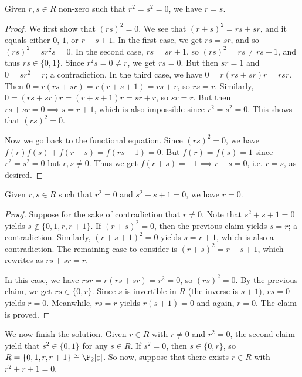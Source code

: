 \begin{claim}
Given $r, s \in R$ non-zero such that $r^2 = s^2 = 0$, we have $r = s$.
\end{claim}
\begin{proof}
We first show that $(rs)^2 = 0$.
We see that $(r + s)^2 = rs + sr$, and it equals either $0$, $1$, or $r + s + 1$.
In the first case, we get $rs = sr$, and so $(rs)^2 = sr^2 s = 0$.
In the second case, $rs = sr + 1$, so $(rs)^2 = rs \neq rs + 1$, and thus $rs \in \{0, 1\}$.
Since $r^2 s = 0 \neq r$, we get $rs = 0$.
But then $sr = 1$ and $0 = sr^2 = r$; a contradiction.
In the third case, we have $0 = r(rs + sr)r = rsr$.
Then $0 = r(rs + sr) = r(r + s + 1) = rs + r$, so $rs = r$.
Similarly, $0 = (rs + sr)r = (r + s + 1)r = sr + r$, so $sr = r$.
But then $rs + sr = 0 \implies s = r + 1$, which is also impossible since $r^2 = s^2 = 0$.
This shows that $(rs)^2 = 0$.

Now we go back to the functional equation.
Since $(rs)^2 = 0$, we have $f(r) f(s) + f(r + s) = f(rs + 1) = 0$.
But $f(r) = f(s) = 1$ since $r^2 = s^2 = 0$ but $r, s \neq 0$.
Thus we get $f(r + s) = -1 \implies r + s = 0$, i.e. $r = s$, as desired.
\end{proof}

\begin{claim}
Given $r, s \in R$ such that $r^2 = 0$ and $s^2 + s + 1 = 0$, we have $r = 0$.
\end{claim}
\begin{proof}
Suppose for the sake of contradiction that $r \neq 0$.
Note that $s^2 + s + 1 = 0$ yields $s \notin \{0, 1, r, r + 1\}$.
If $(r + s)^2 = 0$, then the previous claim yields $s = r$; a contradiction.
Similarly, $(r + s + 1)^2 = 0$ yields $s = r + 1$, which is also a contradiction.
The remaining case to consider is $(r + s)^2 = r + s + 1$, which rewrites as $rs + sr = r$.

In this case, we have $rsr = r(rs + sr) = r^2 = 0$, so $(rs)^2 = 0$.
By the previous claim, we get $rs \in \{0, r\}$.
Since $s$ is invertible in $R$ (the inverse is $s + 1$), $rs = 0$ yields $r = 0$.
Meanwhile, $rs = r$ yields $r(s + 1) = 0$ and again, $r = 0$.
The claim is proved.
\end{proof}

We now finish the solution.
Given $r \in R$ with $r \neq 0$ and $r^2 = 0$, the second claim yield that $s^2 \in \{0, 1\}$ for any $s \in R$.
If $s^2 = 0$, then $s \in \{0, r\}$, so $R = \{0, 1, r, r + 1\} \cong \F_2[\varepsilon]$.
So now, suppose that there exists $r \in R$ with $r^2 + r + 1 = 0$.

